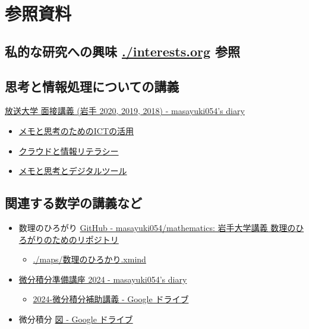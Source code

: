 \documentclass[dvipdfmx,11pat]{jarticle}
\begin{document}
\section{参照資料}
\label{sec:orgb5c8a14}

\subsection{私的な研究への興味 \url{./interests.org} 参照}
\label{sec:orgb79d8e7}

\subsection{思考と情報処理についての講義}
\label{sec:orgd1b9ddc}
\href{https://masayuki054.hatenablog.com/entry/2019/12/09/102219}{放送大学 面接講義 (岩手 2020, 2019, 2018) - masayuki054's diary}
\begin{itemize}
\item \href{https://masayuki054.github.io/ict\_literacy\_for\_thinking\_and\_memo/}{メモと思考のためのICTの活用}
\item \href{https://masayuki054.github.io/cloud\_and\_information\_literacy/talk.html}{クラウドと情報リテラシー}
\item \href{https://masayuki054.github.io/tools\_for\_thinking\_and\_memo/talk.html}{メモと思考とデジタルツール}
\end{itemize}
\subsection{関連する数学の講義など}
\label{sec:orge3db023}
\begin{itemize}
\item 数理のひろがり \href{https://github.com/masayuki054/mathematics/tree/main}{GitHub - masayuki054/mathematics: 岩手大学講義 数理のひろがりのためのリポジトリ}
\begin{itemize}
\item \url{./maps/数理のひろかり.xmind}
\end{itemize}
\item \href{https://masayuki054.hatenablog.com/entry/2024/04/09/225336\#orgfce19b2}{微分積分準備講座 2024 - masayuki054's diary}
\begin{itemize}
\item \href{https://drive.google.com/drive/folders/1fYNIqpHaGYXFeuLxqppoT9cEUCEcmbXp}{2024-微分積分補助講義 - Google ドライブ}
\end{itemize}
\item 微分積分 \href{https://drive.google.com/drive/folders/1lY6qb2Z02iAD\_WdesHNMpmsGecY3ynDa}{図 - Google ドライブ}
\end{itemize}
\end{document}
